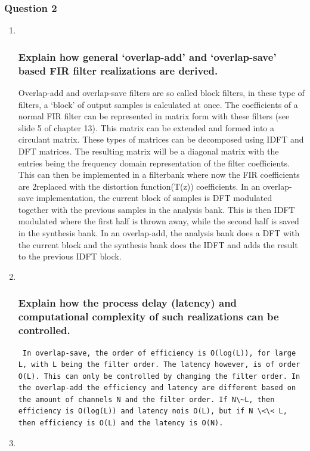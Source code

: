 \documentclass[
  a4paper,
  ,captions=tableheading
]{scrartcl}
\begin{document}
\subsubsection{Question 2}\label{question-2-3}

\begin{enumerate}
\def\labelenumi{\arabic{enumi}.}
\item ~
  \subsubsection{Explain how general `overlap-add' and `overlap-save'
  based FIR filter realizations are
  derived.}\label{explain-how-general-overlap-add-and-overlap-save-based-fir-filter-realizations-are-derived.}

  Overlap-add and overlap-save filters are so called block filters, in
  these type of filters, a `block' of output samples is calculated at
  once. The coefficients of a normal FIR filter can be represented in
  matrix form with these filters (see slide 5 of chapter 13). This
  matrix can be extended and formed into a circulant matrix. These types
  of matrices can be decomposed using IDFT and DFT matrices. The
  resulting matrix will be a diagonal matrix with the entries being the
  frequency domain representation of the filter coefficients. This can
  then be implemented in a filterbank where now the FIR coefficients are
  2replaced with the distortion function(T(z)) coefficients. In an
  overlap-save implementation, the current block of samples is DFT
  modulated together with the previous samples in the analysis bank.
  This is then IDFT modulated where the first half is thrown away, while
  the second half is saved in the synthesis bank. In an overlap-add, the
  analysis bank does a DFT with the current block and the synthesis bank
  does the IDFT and adds the result to the previous IDFT block.
\item ~
  \subsubsection{Explain how the process delay (latency) and
  computational complexity of such realizations can be
  controlled.}\label{explain-how-the-process-delay-latency-and-computational-complexity-of-such-realizations-can-be-controlled.}

\begin{lstlisting}
 In overlap-save, the order of efficiency is O(log(L)), for large L, with L being the filter order. The latency however, is of order O(L). This can only be controlled by changing the filter order. In the overlap-add the efficiency and latency are different based on the amount of channels N and the filter order. If N\~L, then efficiency is O(log(L)) and latency nois O(L), but if N \<\< L, then efficiency is O(L) and the latency is O(N).
\end{lstlisting}
\item ~

\end{enumerate}
\end{document}
